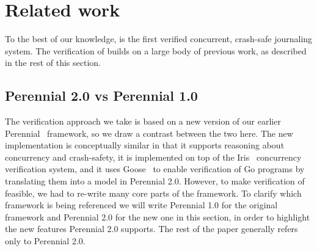 \section{Related work}
\label{s:related}

To the best of our knowledge, \txn is the first verified concurrent,
crash-safe journaling system. The verification of \txn builds on a
large body of previous work, as described in the rest of this
section.

\subsection{Perennial 2.0 vs Perennial 1.0}

The verification approach we take is based on a new version of our earlier
Perennial~\cite{chajed:perennial} framework, so we draw a contrast between the
two here. The new implementation is
conceptually similar in that it supports reasoning about concurrency and
crash-safety, it is implemented on top of the
Iris~\citep{jung:iris-jfp,jung:iris-1} concurrency verification system,
and it uses Goose~\cite{chajed:goose-coqpl} to enable verification of Go
programs by translating them into a model in Perennial 2.0.
However, to make verification of \txn feasible, we had to re-write many core parts of the framework.
To clarify which framework is being referenced we will write Perennial 1.0 for the
original framework and Perennial 2.0 for the new one in this section, in order
to highlight the new features Perennial 2.0 supports. The rest of the paper
generally refers only to Perennial 2.0.



